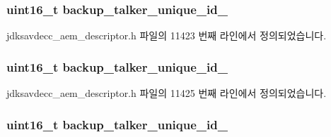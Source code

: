\subsubsection[{\texorpdfstring{backup\+\_\+talker\+\_\+unique\+\_\+id\+\_\+0}{backup_talker_unique_id_0}}]{\setlength{\rightskip}{0pt plus 5cm}uint16\+\_\+t backup\+\_\+talker\+\_\+unique\+\_\+id\+\_}\hypertarget{structjdksavdecc__descriptor__stream_ad46a052a08dd413492ed8c2e049217df}{}\label{structjdksavdecc__descriptor__stream_ad46a052a08dd413492ed8c2e049217df}


jdksavdecc\+\_\+aem\+\_\+descriptor.\+h 파일의 11423 번째 라인에서 정의되었습니다.

\subsubsection[{\texorpdfstring{backup\+\_\+talker\+\_\+unique\+\_\+id\+\_\+1}{backup_talker_unique_id_1}}]{\setlength{\rightskip}{0pt plus 5cm}uint16\+\_\+t backup\+\_\+talker\+\_\+unique\+\_\+id\+\_}\hypertarget{structjdksavdecc__descriptor__stream_a06bead97e1d1c042d2a9da6c5efb5108}{}\label{structjdksavdecc__descriptor__stream_a06bead97e1d1c042d2a9da6c5efb5108}


jdksavdecc\+\_\+aem\+\_\+descriptor.\+h 파일의 11425 번째 라인에서 정의되었습니다.

\subsubsection[{\texorpdfstring{backup\+\_\+talker\+\_\+unique\+\_\+id\+\_\+2}{backup_talker_unique_id_2}}]{\setlength{\rightskip}{0pt plus 5cm}uint16\+\_\+t backup\+\_\+talker\+\_\+unique\+\_\+id\+\_}\hypertarget{structjdksavdecc__descriptor__stream_a97e0bf5439ef92d3caaf24ce5d5bcb7e}{}\label{structjdksavdecc__descriptor__stream_a97e0bf5439ef92d3caaf24ce5d5bcb7e}



